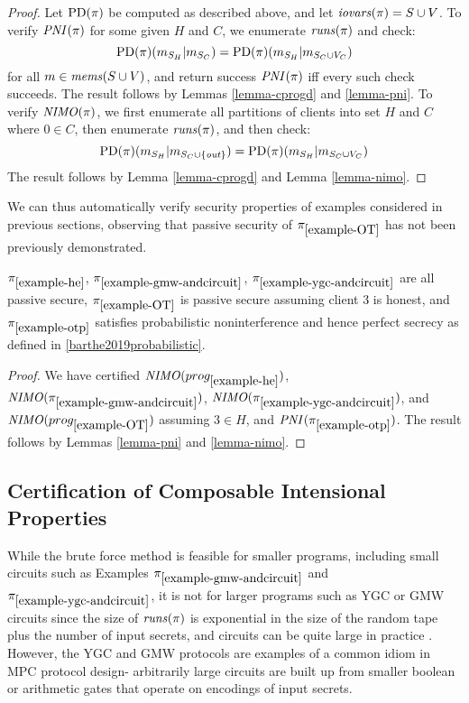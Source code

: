 \begin{proof}
  Let $\mathrm{PD}(\pi)$ be computed as described above, and let $\mathit{iovars}(\pi) = S
  \cup V$. To verify $\mathit{PNI}(\pi)$ for
  some given $H$ and $C$, we enumerate $\mathit{runs}(\pi)$ and check:
  $$
  \mathrm{PD}(\pi)(m_{S_H}|m_{S_C}) =
  \mathrm{PD}(\pi)(m_{S_H}|m_{S_C \cup V_C})
  $$
  for all $m \in \mathit{mems}(S \cup V)$, and return success $\mathit{PNI}(\pi)$ iff every such
  check succeeds. The result follows by Lemmas \ref{lemma-cprogd} and \ref{lemma-pni}.
  To verify $\mathit{NIMO}(\pi)$, we first enumerate all partitions of clients
  into set $H$ and $C$ where $0 \in C$, then enumerate $\mathit{runs}(\pi)$, and
  then check:
  $$
  \mathrm{PD}(\pi)(m_{S_H}|m_{S_C \cup \{\mathit{out}\}}) =
  \mathrm{PD}(\pi)(m_{S_H}|m_{S_C \cup V_C})
  $$
  The result follows by Lemma \ref{lemma-cprogd} and Lemma \ref{lemma-nimo}.
\end{proof}

We can thus automatically verify security properties of examples considered
in previous sections, observing that passive security of $\pi_{\ref{example-OT}}$
has not been previously demonstrated.
\begin{lemma}
  $\pi_{\ref{example-he}}$, $\pi_{\ref{example-gmw-andcircuit}}$,
  $\pi_{\ref{example-ygc-andcircuit}}$ are all passive secure,
  $\pi_{\ref{example-OT}}$ is passive secure assuming client 3 is
  honest, and $\pi_{\ref{example-otp}}$ satisfies probabilistic
  noninterference and hence perfect secrecy as defined in
  \ref{barthe2019probabilistic}.
\end{lemma}
\begin{proof}
  We have certified $\mathit{NIMO}(prog_{\ref{example-he}})$, $\mathit{NIMO}(\pi_{\ref{example-gmw-andcircuit}})$,
  $\mathit{NIMO}(\pi_{\ref{example-ygc-andcircuit}})$, and $\mathit{NIMO}(prog_{\ref{example-OT}})$ assuming
  $3 \in H$, and $\mathit{PNI}(\pi_{\ref{example-otp}})$. The result follows by Lemmas
  \ref{lemma-pni} and \ref{lemma-nimo}.
\end{proof}

\subsection{Certification of Composable Intensional Properties}

While the brute force method is feasible for smaller programs,
including small circuits such as Examples
$\pi_{\ref{example-gmw-andcircuit}}$ and
$\pi_{\ref{example-ygc-andcircuit}}$, it is not for larger programs
such as YGC or GMW circuits since the size of $\mathit{runs}(\pi)$ is
exponential in the size of the random tape plus the number of input
secrets, and circuits can be quite large in practice
\cite{kreuter2012billion}.  However, the YGC and GMW protocols are
examples of a common idiom in MPC protocol design- arbitrarily large
circuits are built up from smaller boolean or arithmetic gates that
operate on encodings of input secrets.

